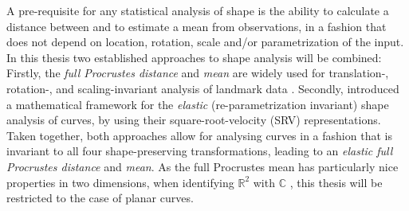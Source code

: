 A pre-requisite for any statistical analysis of shape is the ability to calculate a distance between and to estimate a mean from observations, in a fashion that does not depend on location, rotation, scale and/or parametrization of the input.
In this thesis two established approaches to shape analysis will be combined:
Firstly, the \emph{full Procrustes distance} and \emph{mean} are widely used for translation-, rotation-, and scaling-invariant analysis of landmark data \parencite[see e.g.][Chap.\ 4,\ 6]{DrydenMardia2016}.
Secondly, \cite{SrivastavaEtAl2011} introduced a mathematical framework for the \emph{elastic} (re-parametrization invariant) shape analysis of curves, by using their square-root-velocity (SRV) representations.
Taken together, both approaches allow for analysing curves in a fashion that is invariant to all four shape-preserving transformations, leading to an \emph{elastic full Procrustes distance} and \emph{mean}.
As the full Procrustes mean has particularly nice properties in two dimensions, when identifying $\mathbb{R}^2$ with $\mathbb{C}$ \parencite[see][Chap.\ 8]{DrydenMardia2016}, this thesis will be restricted to the case of planar curves.

